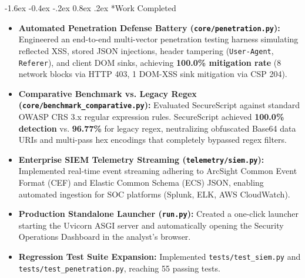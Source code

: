 \documentclass[11pt,a4paper]{article}
\makeatletter
\renewcommand{\section}{\@startsection{section}{1}{\z@}%
  {-1.6ex \@plus -0.4ex \@minus -.2ex}%
  {0.8ex \@plus .2ex}%
  {\normalfont\large\bfseries\color{primaryblue}}}
\makeatother
\begin{document}
\section*{Work Completed}
\begin{itemize}[leftmargin=1.5em, itemsep=1.5pt]
    \item \textbf{Automated Penetration Defense Battery (\texttt{core/penetration.py}):} Engineered an end-to-end multi-vector penetration testing harness simulating reflected XSS, stored JSON injections, header tampering (\texttt{User-Agent}, \texttt{Referer}), and client DOM sinks, achieving \textbf{100.0\% mitigation rate} (8 network blocks via HTTP 403, 1 DOM-XSS sink mitigation via CSP 204).
    \item \textbf{Comparative Benchmark vs. Legacy Regex (\texttt{core/benchmark\_comparative.py}):} Evaluated SecureScript against standard OWASP CRS 3.x regular expression rules. SecureScript achieved \textbf{100.0\% detection} vs. \textbf{96.77\%} for legacy regex, neutralizing obfuscated Base64 data URIs and multi-pass hex encodings that completely bypassed regex filters.
    \item \textbf{Enterprise SIEM Telemetry Streaming (\texttt{telemetry/siem.py}):} Implemented real-time event streaming adhering to ArcSight Common Event Format (CEF) and Elastic Common Schema (ECS) JSON, enabling automated ingestion for SOC platforms (Splunk, ELK, AWS CloudWatch).
    \item \textbf{Production Standalone Launcher (\texttt{run.py}):} Created a one-click launcher starting the Uvicorn ASGI server and automatically opening the Security Operations Dashboard in the analyst's browser.
    \item \textbf{Regression Test Suite Expansion:} Implemented \texttt{tests/test\_siem.py} and \texttt{tests/test\_penetration.py}, reaching 55 passing tests.
\end{itemize}
\end{document}
